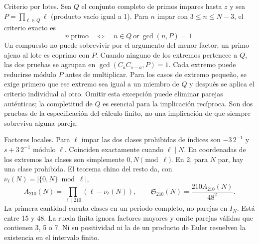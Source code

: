 \documentclass[11pt,a4paper]{article}
\newcommand{\B}[2]{#2}
\newcommand{\B}[2]{#1}
\newcommand{\Sg}{\mathfrak S}
\begin{document}
\B{Batch criterion. Let $Q$ be the complete set of odd primes up to $z$ and $P=\prod_{\ell\in Q}\ell$ (empty product 1). For $n$ an odd integer with $3\le n\le N-3$, the exact test is}{Criterio por lotes. Sea $Q$ el conjunto completo de primos impares hasta $z$ y sea $P=\prod_{\ell\in Q}\ell$ (producto vacío igual a 1). Para $n$ impar con $3\le n\le N-3$, el criterio exacto es}
\[
 n\ \B{\text{prime}}{\text{primo}}\quad\Longleftrightarrow\quad n\in Q\ \text{or}\ \gcd(n,P)=1.
\]
\B{A composite cannot survive by the least-factor argument; a prime outside the batch is coprime to $P$. On the subset where neither endpoint belongs to $Q$, both endpoint tests combine into $\gcd(C_a C_{s-a},P)=1$. Each endpoint may be reduced modulo $P$ before multiplying. For the omitted small-endpoint cases first require that the corresponding endpoint equal a member of $Q$, then apply the individual test to the other. Omitting this exception can remove genuine pairs; completeness of $Q$ is essential to the converse. These are two proofs of the specification of the finite calculation, not an implication that the final survivor set is always nonempty.}{Un compuesto no puede sobrevivir por el argumento del menor factor; un primo ajeno al lote es coprimo con $P$. Cuando ninguno de los extremos pertenece a $Q$, las dos pruebas se agrupan en $\gcd(C_a C_{s-a},P)=1$. Cada extremo puede reducirse módulo $P$ antes de multiplicar. Para los casos de extremo pequeño, se exige primero que ese extremo sea igual a un miembro de $Q$ y después se aplica el criterio individual al otro. Omitir esta excepción puede eliminar parejas auténticas; la completitud de $Q$ es esencial para la implicación recíproca. Son dos pruebas de la especificación del cálculo finito, no una implicación de que siempre sobreviva alguna pareja.}

\B{Local factors. For odd $\ell$ the two forbidden index classes are $-3\,2^{-1}$ and $s+3\,2^{-1}$ modulo $\ell$. They coincide exactly when $\ell\mid N$. In endpoint coordinates, the classes are simply $0,N\pmod\ell$. At 2, for even $N$, there is one forbidden class. The Chinese remainder theorem therefore gives, with $\nu_\ell(N)=|\{0,N\}\bmod\ell|$,}{Factores locales. Para $\ell$ impar las dos clases prohibidas de índices son $-3\,2^{-1}$ y $s+3\,2^{-1}$ módulo $\ell$. Coinciden exactamente cuando $\ell\mid N$. En coordenadas de los extremos las clases son simplemente $0,N\pmod\ell$. En 2, para $N$ par, hay una clase prohibida. El teorema chino del resto da, con $\nu_\ell(N)=|\{0,N\}\bmod\ell|$,}
\[
 A_{210}(N)=\prod_{\ell\mid210}(\ell-\nu_\ell(N)),\qquad
 \Sg_{210}(N)=\frac{210 A_{210}(N)}{48^2}.
\]
\B{The first quantity counts classes over a full period, not pairs in $I_N$. It lies between 15 and 48. The finite wheel ignores larger factors and omits valid pairs containing 3, 5 or 7. Neither its positivity nor the positivity of an Euler product settles the finite-interval existence question.}{La primera cantidad cuenta clases en un periodo completo, no parejas en $I_N$. Está entre 15 y 48. La rueda finita ignora factores mayores y omite parejas válidas que contienen 3, 5 o 7. Ni su positividad ni la de un producto de Euler resuelven la existencia en el intervalo finito.}
\end{document}

